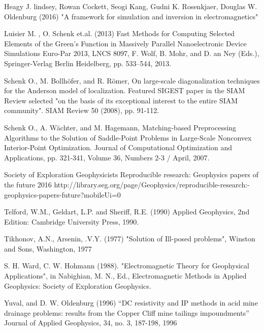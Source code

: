 \documentclass[twoside]{article}
\begin{document}
\begin{thebibliography}{99}
Heagy J. lindsey, Rowan Cockett, Seogi Kang, Gudni K. Rosenkjaer, Douglas W. Oldenburg (2016)
\newblock "A framework for simulation and inversion in electromagnetics"

Luisier M. , O. Schenk et.al. (2013)
\newblock Fast Methods for Computing Selected Elements of the Green's Function in Massively Parallel Nanoelectronic Device Simulations
\newblock Euro-Par 2013, LNCS 8097, F. Wolf, B. Mohr, and D. an Ney (Eds.), Springer-Verlag Berlin Heidelberg, pp. 533–544, 2013.

Schenk O., M. Bollhöfer, and R. Römer,
\newblock On large-scale diagonalization techniques for the Anderson model of localization.
\newblock Featured SIGEST paper in the SIAM Review selected "on the basis of its exceptional interest to the entire SIAM community". SIAM Review 50 (2008), pp. 91-112.

Schenk O., A. Wächter, and M. Hagemann,
\newblock Matching-based Preprocessing Algorithms to the Solution of Saddle-Point Problems in Large-Scale Nonconvex Interior-Point Optimization.
\newblock Journal of Computational Optimization and Applications, pp. 321-341, Volume 36, Numbers 2-3 / April, 2007.

Society of Exploration Geophysicists
\newblock Reproducible research: Geophysics papers of the future 2016
\newblock http://library.seg.org/page/Geophysics/reproducible-research:-geophysics-papers-future?mobileUi=0

Telford, W.M., Geldart, L.P. and Sheriff, R.E. (1990)
\newblock Applied Geophysics, 2nd Edition: Cambridge University Press, 1990.

Tikhonov, A.N., Arsenin, .V.Y. (1977)
\newblock "Solution of Ill-posed problems", Winston and Sons, Washington, 1977  

S. H. Ward, C. W. Hohmann (1988).
\newblock "Electromagnetic Theory for Geophysical Applications", in Nabighian, M. N., Ed., Electromagnetic Methods in Applied Geophysics: Society of Exploration Geophysics.

Yuval, and D. W. Oldenburg (1996)
\newblock “DC resistivity and IP methods in acid mine drainage problems: results from the Copper Cliff mine tailings impoundments” Journal of Applied Geophysics, 34, no. 3, 187-198, 1996

\end{thebibliography}

\end{document}
